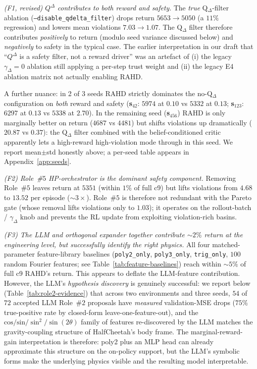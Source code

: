 \documentclass{article}
\theoremstyle{definition}
\newcommand{\QD}{Q^{\Delta}}
\begin{document}
\emph{(F1, revised) $\QD$ contributes to both reward and safety.}  The
\emph{true} Q$_\Delta$-filter ablation
(\texttt{--disable\_qdelta\_filter}) drops return $5653\!\to\!5050$
(a $11\%$ regression) and lowers mean violations $7.03\!\to\!1.07$.
The Q$_\Delta$ filter therefore contributes \emph{positively} to
return (modulo seed variance discussed below) and \emph{negatively}
to safety in the typical case.  The earlier interpretation in our
draft that ``$\QD$ is a safety filter, not a reward driver'' was an
artefact of (i) the legacy $\gamma_\Delta\!=\!0$ ablation still
applying a per-step trust weight and (ii) the legacy E4 ablation
matrix not actually enabling RAHD.

A further nuance: in 2 of 3 seeds RAHD strictly dominates the no-Q$_\Delta$
configuration on \emph{both} reward and safety
(\textbf{s$_{42}$}: $5974$ at $0.10$ vs $5332$ at $0.13$;
\textbf{s$_{123}$}: $6297$ at $0.13$ vs $5338$ at $2.70$).  In the
remaining seed (\textbf{s$_{456}$}) RAHD is only marginally better on
return ($4687$ vs $4481$) but shifts violations up dramatically
($20.87$ vs $0.37$): the Q$_\Delta$ filter combined with the
belief-conditioned critic apparently lets a high-reward
high-violation mode through in this seed.  We report mean$\pm$std
honestly above; a per-seed table appears in
Appendix~\ref{app:seeds}.

\emph{(F2) Role~\#$5$ HP-orchestrator is the dominant safety
component.}  Removing Role~\#$5$ leaves return at $5351$ (within $1\%$
of full c9) but lifts violations from $4.68$ to $13.52$ per episode
($\sim 3\times$).  Role~\#$5$ is therefore not redundant with the
Pareto gate (whose removal lifts violations only to $1.03$); it
operates on the rollout-batch / $\gamma_\Delta$ knob and prevents the
RL update from exploiting violation-rich basins.

\emph{(F3) The LLM and orthogonal expander together contribute
$\sim 2\%$ return at the engineering level, but successfully identify
the right physics.}  All four matched-parameter feature-library
baselines (\texttt{poly2\_only}, \texttt{poly3\_only},
\texttt{trig\_only}, $100$ random Fourier features; see
Table~\ref{tab:feature-baselines}) reach within
$\sim 5\%$ of full c9 RAHD's return.  This appears to deflate the
LLM-feature contribution.  However, the LLM's \emph{hypothesis discovery}
is genuinely successful: we report below (Table~\ref{tab:role2-evidence})
that across two environments and three seeds, $54$ of $72$ accepted
LLM Role~\#$2$ proposals have \emph{measured} validation-MSE drops
($75\%$ true-positive rate by closed-form leave-one-feature-out), and
the $\mathrm{cos/sin}/\sin^2/\sin(2\theta)$ family of features
re-discovered by the LLM matches the gravity-coupling structure of
HalfCheetah's body frame.  The marginal-reward-gain interpretation is
therefore: poly2 plus an MLP head can already approximate this
structure on the on-policy support, but the LLM's symbolic forms make
the underlying physics visible and the resulting model interpretable.
\end{document}
